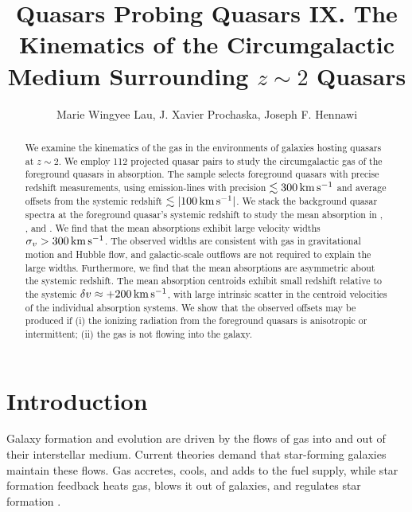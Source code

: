 \documentclass[iop]{emulateapj}
\begin{document}
\title{Quasars Probing Quasars IX. The Kinematics of the Circumgalactic Medium Surrounding 
$z\sim2$ Quasars}

\author{Marie Wingyee Lau, J. Xavier Prochaska, 
Joseph F. Hennawi
}

\begin{abstract}
We examine the kinematics of the gas in the environments of galaxies hosting quasars at $z\sim2$. 
We employ 112 projected quasar pairs to study the circumgalactic gas of the foreground quasars in 
absorption. The sample selects foreground quasars with precise redshift measurements, using 
emission-lines with precision $\lesssim300\,{\rm km\,s^{-1}}$ and average offsets from the 
systemic redshift $\lesssim|100\,{\rm km\,s^{-1}}|$. We stack the background quasar spectra at the 
foreground quasar's systemic redshift to study the mean absorption in , , 
and . We find that the mean absorptions exhibit large velocity widths 
$\sigma_v>300\,{\rm km\,s^{-1}}$. The observed widths are consistent with gas in gravitational 
motion and Hubble flow, and galactic-scale outflows are not required to explain the large 
widths. Furthermore, we find that the mean absorptions are asymmetric about the systemic redshift. 
The mean absorption centroids exhibit small redshift relative to the 
systemic $\delta v\approx+200\,{\rm km\,s^{-1}}$, with large intrinsic scatter in the centroid 
velocities of the individual absorption systems. We show that the observed offsets may be produced 
if (i) the ionizing radiation from the foreground quasars is anisotropic or intermittent; (ii) the 
gas is not flowing into the galaxy.  
\end{abstract}



\section{Introduction}
\label{sec:introduction}

Galaxy formation and evolution are driven by the flows of gas into and out of their interstellar 
medium. Current theories demand that star-forming galaxies maintain these flows. Gas accretes, 
cools, and adds to the fuel supply, while star formation feedback heats gas, blows it out of 
galaxies, and regulates star formation \citep[for a review see][]{SomervilleDave15}. 
\end{document}
